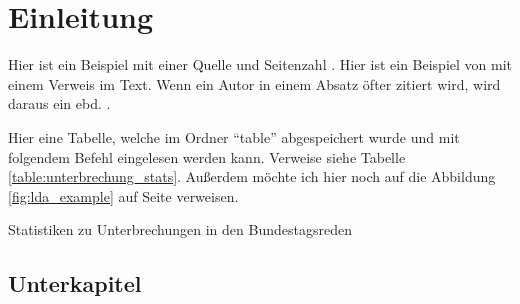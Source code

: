 \documentclass[12pt, twoside=false, bibliography=totoc, numbers=endperiod, headings=normal, toc=chapterentrydotfill]{scrbook}
\begin{document}


\frontmatter

\tableofcontents

\listoffigures
{}
\vspace*{24pt}
{\let\clearpage\relax \listoftables}	

\mainmatter

\chapter{Einleitung}\label{Einleitung} %

Hier ist ein Beispiel mit einer Quelle und Seitenzahl \parencite[S. 103]{wangnerud_2009}. Hier ist ein Beispiel von \textcite{erikson_2018} mit einem Verweis im Text. Wenn ein Autor in einem Absatz öfter zitiert wird, wird daraus ein ebd. \parencite{erikson_2018}.

Hier eine Tabelle, welche im Ordner \enquote{table} abgespeichert wurde und mit folgendem Befehl eingelesen werden kann. Verweise siehe Tabelle \ref{table:unterbrechung_stats}. Außerdem möchte ich hier noch auf die Abbildung \ref{fig:lda_example} auf Seite \pageref{fig:lda_example} verweisen. 

\begin{table}[htb]
    \centering
    \caption{Statistiken zu Unterbrechungen in den Bundestagsreden}
    
    \label{table:unterbrechung_stats}
\end{table}

\Blindtext

\section{Unterkapitel}

\blindtext
\\
\end{document}
